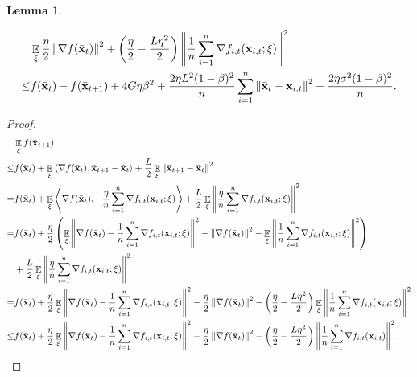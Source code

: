 \documentclass{article}
\newtheorem{Lemma}{\bf{Lemma}}
\begin{document}
\begin{Lemma}
\label{lemma_gradient_norm_bound}

\nonumber
\begin{align}
\nonumber
& \mathop{\mathbb{E}}_{\xi}\frac{\eta}{2}\left\lVert\nabla f(\bar{{\bf x}}_t)\right\rVert^2 + \left( \frac{\eta}{2} - \frac{L\eta^2}{2} \right)\left\lVert\frac{1}{n}\sum_{i=1}^n \nabla f_{i,t}({\bf x}_{i,t};\xi)\right\rVert^2 \\ \nonumber 
\le & f(\bar{{\bf x}}_t) - f(\bar{{\bf x}}_{t+1}) + 4G\eta\beta^2 +  \frac{2\eta L^2(1-\beta)^2}{n}\sum_{i=1}^n\left\lVert\bar{{\bf x}}_t - {\bf x}_{i,t} \right\rVert^2 + \frac{2\eta\sigma^2(1-\beta)^2}{n}.
\end{align}
\end{Lemma}
\begin{proof}

\begin{align}
\nonumber
& \mathop{\mathbb{E}}_{\xi}f(\bar{{\bf x}}_{t+1}) \\ \nonumber
\le & f(\bar{{\bf x}}_t) + \mathop{\mathbb{E}}_{\xi}\left\langle\nabla f(\bar{{\bf x}}_t), \bar{{\bf x}}_{t+1} - \bar{{\bf x}}_t \right\rangle + \frac{L}{2}\mathop{\mathbb{E}}_{\xi}\left\lVert\bar{{\bf x}}_{t+1} - \bar{{\bf x}}_t\right\rVert^2 \\ \nonumber
= & f(\bar{{\bf x}}_t) + \mathop{\mathbb{E}}_{\xi}\left\langle\nabla f(\bar{{\bf x}}_t), -\frac{\eta}{n}\sum_{i=1}^n \nabla f_{i,t}({\bf x}_{i,t};\xi) \right\rangle + \frac{L}{2} \mathop{\mathbb{E}}_{\xi}\left\lVert\frac{\eta}{n}\sum_{i=1}^n \nabla f_{i,t}({\bf x}_{i,t};\xi)\right\rVert^2 \\ \nonumber
= & f(\bar{{\bf x}}_t) + \frac{\eta}{2}\left( \mathop{\mathbb{E}}_{\xi}\left\lVert\nabla f(\bar{{\bf x}}_t) -\frac{1}{n}\sum_{i=1}^n \nabla f_{i,t}({\bf x}_{i,t};\xi)\right\rVert^2 - \left\lVert\nabla f(\bar{{\bf x}}_t)\right\rVert^2 - \mathop{\mathbb{E}}_{\xi}\left\lVert\frac{1}{n}\sum_{i=1}^n \nabla f_{i,t}({\bf x}_{i,t};\xi)\right\rVert^2  \right) \\ \nonumber 
& + \frac{L}{2}\mathop{\mathbb{E}}_{\xi}\left\lVert\frac{\eta}{n}\sum_{i=1}^n \nabla f_{i,t}({\bf x}_{i,t};\xi)\right\rVert^2 \\ \nonumber
= & f(\bar{{\bf x}}_t) + \frac{\eta}{2}\mathop{\mathbb{E}}_{\xi}\left\lVert\nabla f(\bar{{\bf x}}_t) -\frac{1}{n}\sum_{i=1}^n \nabla f_{i,t}({\bf x}_{i,t};\xi)\right\rVert^2 - \frac{\eta}{2}\left\lVert\nabla f(\bar{{\bf x}}_t)\right\rVert^2 - \left( \frac{\eta}{2} - \frac{L\eta^2}{2} \right)\mathop{\mathbb{E}}_{\xi}\left\lVert\frac{1}{n}\sum_{i=1}^n \nabla f_{i,t}({\bf x}_{i,t};\xi)\right\rVert^2 \\ \label{equa_lemma_norm_gradient_square}
\le & f(\bar{{\bf x}}_t) + \frac{\eta}{2}\mathop{\mathbb{E}}_{\xi}\left\lVert\nabla f(\bar{{\bf x}}_t) -\frac{1}{n}\sum_{i=1}^n \nabla f_{i,t}({\bf x}_{i,t};\xi)\right\rVert^2 - \frac{\eta}{2}\left\lVert\nabla f(\bar{{\bf x}}_t)\right\rVert^2 - \left( \frac{\eta}{2} - \frac{L\eta^2}{2} \right)\left\lVert\frac{1}{n}\sum_{i=1}^n \nabla f_{i,t}({\bf x}_{i,t})\right\rVert^2.
\end{align} 


\end{proof}
\end{document}
